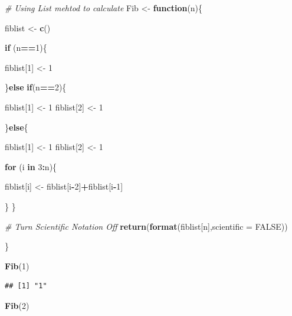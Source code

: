 \documentclass[]{article}
\newenvironment{Shaded}{\begin{snugshade}}{\end{snugshade}}
\newcommand{\KeywordTok}[1]{\textcolor[rgb]{0.13,0.29,0.53}{\textbf{#1}}}
\newcommand{\DataTypeTok}[1]{\textcolor[rgb]{0.13,0.29,0.53}{#1}}
\newcommand{\DecValTok}[1]{\textcolor[rgb]{0.00,0.00,0.81}{#1}}
\newcommand{\StringTok}[1]{\textcolor[rgb]{0.31,0.60,0.02}{#1}}
\newcommand{\CommentTok}[1]{\textcolor[rgb]{0.56,0.35,0.01}{\textit{#1}}}
\newcommand{\OtherTok}[1]{\textcolor[rgb]{0.56,0.35,0.01}{#1}}
\newcommand{\ControlFlowTok}[1]{\textcolor[rgb]{0.13,0.29,0.53}{\textbf{#1}}}
\newcommand{\OperatorTok}[1]{\textcolor[rgb]{0.81,0.36,0.00}{\textbf{#1}}}
\newcommand{\NormalTok}[1]{#1}
\begin{document}
\begin{Shaded}
\begin{Highlighting}[]
\CommentTok{# Using List mehtod to calculate}
\NormalTok{Fib <-}\StringTok{ }\ControlFlowTok{function}\NormalTok{(n)\{}
  
\NormalTok{  fiblist <-}\StringTok{ }\KeywordTok{c}\NormalTok{()}
  
  \ControlFlowTok{if}\NormalTok{ (n}\OperatorTok{==}\DecValTok{1}\NormalTok{)\{}
    
\NormalTok{    fiblist[}\DecValTok{1}\NormalTok{] <-}\StringTok{ }\DecValTok{1}
    
\NormalTok{  \}}\ControlFlowTok{else} \ControlFlowTok{if}\NormalTok{(n}\OperatorTok{==}\DecValTok{2}\NormalTok{)\{}
    
\NormalTok{    fiblist[}\DecValTok{1}\NormalTok{] <-}\StringTok{ }\DecValTok{1}
\NormalTok{    fiblist[}\DecValTok{2}\NormalTok{] <-}\StringTok{ }\DecValTok{1}
    
\NormalTok{  \}}\ControlFlowTok{else}\NormalTok{\{}
  
\NormalTok{    fiblist[}\DecValTok{1}\NormalTok{] <-}\StringTok{ }\DecValTok{1}
\NormalTok{    fiblist[}\DecValTok{2}\NormalTok{] <-}\StringTok{ }\DecValTok{1}
    
    \ControlFlowTok{for}\NormalTok{ (i }\ControlFlowTok{in} \DecValTok{3}\OperatorTok{:}\NormalTok{n)\{}

\NormalTok{      fiblist[i] <-}\StringTok{ }\NormalTok{fiblist[i}\OperatorTok{-}\DecValTok{2}\NormalTok{]}\OperatorTok{+}\NormalTok{fiblist[i}\OperatorTok{-}\DecValTok{1}\NormalTok{]}

\NormalTok{    \}}
\NormalTok{  \}}

  \CommentTok{# Turn Scientific Notation Off}
  \KeywordTok{return}\NormalTok{(}\KeywordTok{format}\NormalTok{(fiblist[n],}\DataTypeTok{scientific =} \OtherTok{FALSE}\NormalTok{))}
  
\NormalTok{\}}

\KeywordTok{Fib}\NormalTok{(}\DecValTok{1}\NormalTok{)}
\end{Highlighting}
\end{Shaded}

\begin{verbatim}
## [1] "1"
\end{verbatim}

\begin{Shaded}
\begin{Highlighting}[]
\KeywordTok{Fib}\NormalTok{(}\DecValTok{2}\NormalTok{)}
\end{Highlighting}
\end{Shaded}
\end{document}
